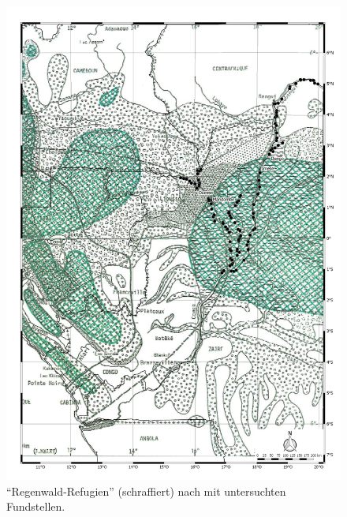 \begin{figure}[p]
	\centering
	\includegraphics[width=\textwidth]{fig/1-5_RefugienMaley.pdf}
	\caption{\enquote{Regenwald-Refugien} (schraffiert) nach \textcite[7 Abb.~4]{Maley.2001} mit untersuchten Fundstellen.}
	\label{fig:Maley2001_7Abb4}
\end{figure}


